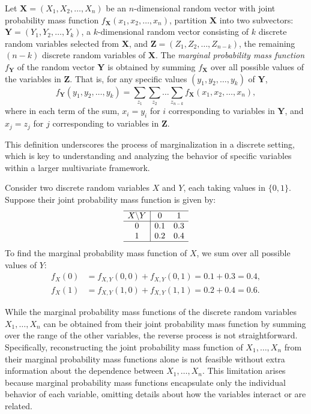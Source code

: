 \begin{definition}
Let $\mathbf{X} = (X_{1}, X_{2}, \ldots, X_{n})$ be an $n$-dimensional random vector with joint probability mass function $f_{\mathbf{X}}(x_{1}, x_{2}, \ldots, x_{n})$, partition $\mathbf{X}$ into two subvectors: $\mathbf{Y} = (Y_{1}, Y_{2}, \ldots, Y_{k})$, a $k$-dimensional random vector consisting of $k$ discrete random variables selected from $\mathbf{X}$, and $\mathbf{Z} = (Z_{1}, Z_{2}, \ldots, Z_{n-k})$, the remaining $(n - k)$ discrete random variables of $\mathbf{X}$. The \emph{marginal probability mass function} $f_{\mathbf{Y}}$ of the random vector $\mathbf{Y}$ is obtained by summing $f_{\mathbf{X}}$ over all possible values of the variables in $\mathbf{Z}$. That is, for any specific values $(y_{1}, y_{2}, \ldots, y_{k})$ of $\mathbf{Y}$,
\[
f_{\mathbf{Y}}(y_{1}, y_{2}, \ldots, y_{k}) = \sum_{z_{1}} \sum_{z_{2}} \ldots \sum_{z_{n-k}} f_{\mathbf{X}}(x_{1}, x_{2}, \ldots, x_{n}),
\]
where in each term of the sum, $x_{i} = y_{i}$ for $i$ corresponding to variables in $\mathbf{Y}$, and $x_{j} = z_{j}$ for $j$ corresponding to variables in $\mathbf{Z}$.
\end{definition}

This definition underscores the process of marginalization in a discrete setting, which is key to understanding and analyzing the behavior of specific variables within a larger multivariate framework.

\begin{example}
Consider two discrete random variables $X$ and $Y$, each taking values in $\{0, 1\}$. Suppose their joint probability mass function is given by:
\[
\begin{array}{c|cc}
\hline
X \backslash Y & 0 & 1 \\
\hline
0 & 0.1 & 0.3 \\
1 & 0.2 & 0.4 \\
\hline
\end{array}
\]
To find the marginal probability mass function of $X$, we sum over all possible values of $Y$:
\[
\begin{aligned}
f_{X}(0) &= f_{X,Y}(0,0) + f_{X,Y}(0,1) = 0.1 + 0.3 = 0.4, \\
f_{X}(1) &= f_{X,Y}(1,0) + f_{X,Y}(1,1) = 0.2 + 0.4 = 0.6.
\end{aligned}
\]
\end{example}

While the marginal probability mass functions of the discrete random variables $X_{1}, \ldots, X_{n}$ can be obtained from their joint probability mass function by summing over the range of the other variables, the reverse process is not straightforward. Specifically, reconstructing the joint probability mass function of $X_{1}, \ldots, X_{n}$ from their marginal probability mass functions alone is not feasible without extra information about the dependence between $X_{1}, \ldots, X_{n}$. This limitation arises because marginal probability mass functions encapsulate only the individual behavior of each variable, omitting details about how the variables interact or are related.

